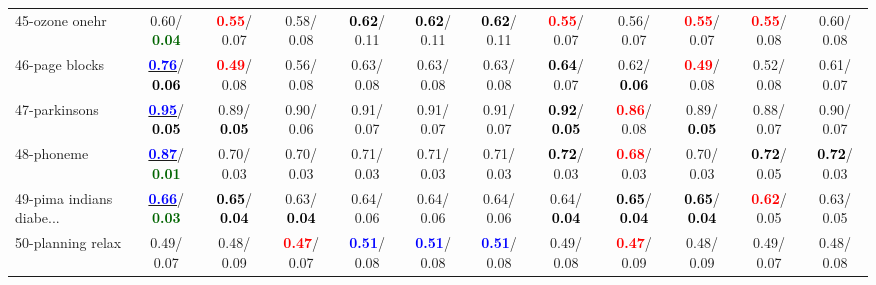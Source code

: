 \begin{table}[h]
\begin{center}
{\begin{tabular}{lc|c|c|c|c|c|c|c|c|c|c}
45-ozone onehr &   0.60/\textcolor{darkgreen}{\textbf{  0.04}} & \textcolor{red}{\textbf{  0.55}}/  0.07 &   0.58/  0.08 & \textcolor{black}{\textbf{  0.62}}/  0.11 & \textcolor{black}{\textbf{  0.62}}/  0.11 & \textcolor{black}{\textbf{  0.62}}/  0.11 & \textcolor{red}{\textbf{  0.55}}/  0.07 &   0.56/  0.07 & \textcolor{red}{\textbf{  0.55}}/  0.07 & \textcolor{red}{\textbf{  0.55}}/  0.08 &   0.60/  0.08 \\
46-page blocks & \underline{\textcolor{blue}{\textbf{  0.76}}}/\textcolor{black}{\textbf{  0.06}} & \textcolor{red}{\textbf{  0.49}}/  0.08 &   0.56/  0.08 &   0.63/  0.08 &   0.63/  0.08 &   0.63/  0.08 & \textcolor{black}{\textbf{  0.64}}/  0.07 &   0.62/\textcolor{black}{\textbf{  0.06}} & \textcolor{red}{\textbf{  0.49}}/  0.08 &   0.52/  0.08 &   0.61/  0.07 \\ \hline
47-parkinsons & \underline{\textcolor{blue}{\textbf{  0.95}}}/\textcolor{black}{\textbf{  0.05}} &   0.89/\textcolor{black}{\textbf{  0.05}} &   0.90/  0.06 &   0.91/  0.07 &   0.91/  0.07 &   0.91/  0.07 & \textcolor{black}{\textbf{  0.92}}/\textcolor{black}{\textbf{  0.05}} & \textcolor{red}{\textbf{  0.86}}/  0.08 &   0.89/\textcolor{black}{\textbf{  0.05}} &   0.88/  0.07 &   0.90/  0.07 \\
48-phoneme & \underline{\textcolor{blue}{\textbf{  0.87}}}/\textcolor{darkgreen}{\textbf{  0.01}} &   0.70/  0.03 &   0.70/  0.03 &   0.71/  0.03 &   0.71/  0.03 &   0.71/  0.03 & \textcolor{black}{\textbf{  0.72}}/  0.03 & \textcolor{red}{\textbf{  0.68}}/  0.03 &   0.70/  0.03 & \textcolor{black}{\textbf{  0.72}}/  0.05 & \textcolor{black}{\textbf{  0.72}}/  0.03 \\
49-pima indians diabe... & \underline{\textcolor{blue}{\textbf{  0.66}}}/\textcolor{darkgreen}{\textbf{  0.03}} & \textcolor{black}{\textbf{  0.65}}/\textcolor{black}{\textbf{  0.04}} &   0.63/\textcolor{black}{\textbf{  0.04}} &   0.64/  0.06 &   0.64/  0.06 &   0.64/  0.06 &   0.64/\textcolor{black}{\textbf{  0.04}} & \textcolor{black}{\textbf{  0.65}}/\textcolor{black}{\textbf{  0.04}} & \textcolor{black}{\textbf{  0.65}}/\textcolor{black}{\textbf{  0.04}} & \textcolor{red}{\textbf{  0.62}}/  0.05 &   0.63/  0.05 \\
50-planning relax &   0.49/  0.07 &   0.48/  0.09 & \textcolor{red}{\textbf{  0.47}}/  0.07 & \textcolor{blue}{\textbf{  0.51}}/  0.08 & \textcolor{blue}{\textbf{  0.51}}/  0.08 & \textcolor{blue}{\textbf{  0.51}}/  0.08 &   0.49/  0.08 & \textcolor{red}{\textbf{  0.47}}/  0.09 &   0.48/  0.09 &   0.49/  0.07 &   0.48/  0.08 \\

\end{tabular}}
\end{center}
\end{table}
